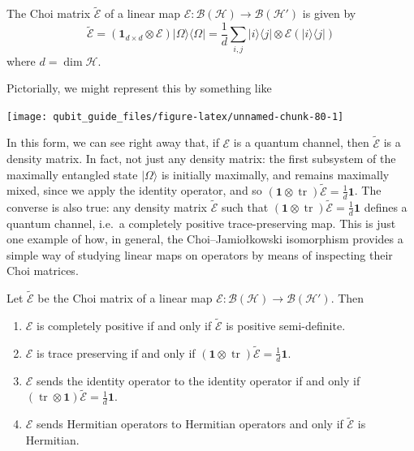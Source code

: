 \documentclass[fleqn,a4paper]{article}
\providecommand{\tightlist}{\setlength{\itemsep}{0pt}\setlength{\parskip}{0pt}}
\newenvironment{idea}{\everypar{\setlength{\parindent}{1.5em}}}{}
\theoremstyle{definition}
\theoremstyle{definition}
\theoremstyle{definition}
\theoremstyle{definition}
\theoremstyle{remark}
\begin{document}
\begin{idea}

The Choi matrix \(\widetilde{\mathcal{E}}\) of a linear map \(\mathcal{E}\colon\mathcal{B}(\mathcal{H})\to\mathcal{B}(\mathcal{H'})\) is given by
\[
  \widetilde{\mathcal{E}}
  = (\mathbf{1}_{d\times d}\otimes\mathcal{E})|\Omega\rangle\langle\Omega|
  = \frac{1}{d} \sum_{i,j} |i\rangle\langle j|\otimes\mathcal{E}(|i\rangle\langle j|)
\]
where \(d=\dim\mathcal{H}\).

Pictorially, we might represent this by something like

\begin{center}\texttt{[image: qubit\_guide\_files/figure-latex/unnamed-chunk-80-1]} \end{center}

\end{idea}

In this form, we can see right away that, if \(\mathcal{E}\) is a quantum channel, then \(\widetilde{\mathcal{E}}\) is a density matrix.
In fact, not just any density matrix: the first subsystem of the maximally entangled state \(|\Omega\rangle\) is initially maximally, and remains maximally mixed, since we apply the identity operator, and so \((\mathbf{1}\otimes\operatorname{tr})\widetilde{\mathcal{E}}=\frac{1}{d}\mathbf{1}\).
The converse is also true: any density matrix \(\widetilde{\mathcal{E}}\) such that \((\mathbf{1}\otimes\operatorname{tr})\widetilde{\mathcal{E}}=\frac{1}{d}\mathbf{1}\) defines a quantum channel, i.e.~a completely positive trace-preserving map.
This is just one example of how, in general, the Choi--Jamiołkowski isomorphism provides a simple way of studying linear maps on operators by means of inspecting their Choi matrices.

\begin{idea}

Let \(\widetilde{\mathcal{E}}\) be the Choi matrix of a linear map \(\mathcal{E}\colon\mathcal{B}(\mathcal{H})\to\mathcal{B}(\mathcal{H'})\).
Then

\begin{enumerate}
\def\labelenumi{\arabic{enumi}.}
\tightlist
\item
  \(\mathcal{E}\) is completely positive if and only if \(\widetilde{\mathcal{E}}\) is positive semi-definite.
\item
  \(\mathcal{E}\) is trace preserving if and only if \((\mathbf{1}\otimes\operatorname{tr})\widetilde{\mathcal{E}}=\frac{1}{d}\mathbf{1}\).
\item
  \(\mathcal{E}\) sends the identity operator to the identity operator if and only if \((\operatorname{tr}\otimes\mathbf{1})\widetilde{\mathcal{E}}=\frac{1}{d}\mathbf{1}\).
\item
  \(\mathcal{E}\) sends Hermitian operators to Hermitian operators and only if \(\widetilde{\mathcal{E}}\) is Hermitian.
\end{enumerate}

\end{idea}
\end{document}
